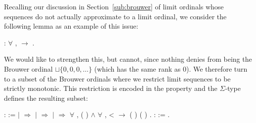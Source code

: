 Recalling our discussion in Section~\ref{sub:brouwer} of limit ordinals whose
sequences do not actually approximate to a limit ordinal, we consider the
following lemma as an example of this issue:
\begin{singlespace}
\begin{coqdoccode}
\coqdocnoindent
{}
:
\ensuremath{\forall} \coqdocvar{\ensuremath{\alpha}} \coqdocvar{\ensuremath{\beta}},
\coqdocvariable{\ensuremath{\alpha}} \coqdocinductive{\ensuremath{\preceq}}
\ensuremath{\rightarrow}
\coqdocvariable{\ensuremath{\alpha}} \coqdocinductive{\ensuremath{\preceq}}
\coqdocvariable{\ensuremath{\beta}}.\coqdoceol
\end{coqdoccode}
\end{singlespace}
We would like to strengthen this, but cannot, since nothing denies \coqdocvariable{\ensuremath{\alpha}}
from being the Brouwer ordinal $\sqcup \{ 0, 0, 0, \ldots \}$ (which has the
same rank as $0$). We therefore turn to a subset of the Brouwer ordinals where
we restrict limit sequences to be strictly monotonic. This restriction is
encoded in the  property and the
$\Sigma$-type 
defines the resulting subset:
\begin{singlespace}
\begin{coqdoccode}
\coqdocnoindent
{} 
\coqdocvar{\ensuremath{\alpha}} :  :=\coqdoceol
\coqdocindent{1.00em}
 \coqdocvariable{\ensuremath{\alpha}} \coqdoceol
\coqdocindent{1.00em}
\ensuremath{|} 
\ensuremath{\Rightarrow}
\coqdoceol
\coqdocindent{1.00em}
\ensuremath{|} 
\coqdocvar{\ensuremath{\beta}} \ensuremath{\Rightarrow}
 \coqdocvariable{\ensuremath{\beta}}\coqdoceol
\coqdocindent{1.00em}
\ensuremath{|}  
\ensuremath{\Rightarrow} \ensuremath{\forall} ,
 (
) \ensuremath{\land} \ensuremath{\forall} ,
 <  \ensuremath{\rightarrow}
( ) \coqdocdefinition{\ensuremath{\prec}}
( )\coqdoceol
\coqdocindent{1.00em}
.\coqdoceol
\coqdocemptyline
\coqdocnoindent
{}
 : 
:=
.\coqdoceol
\end{coqdoccode}
\end{singlespace}

